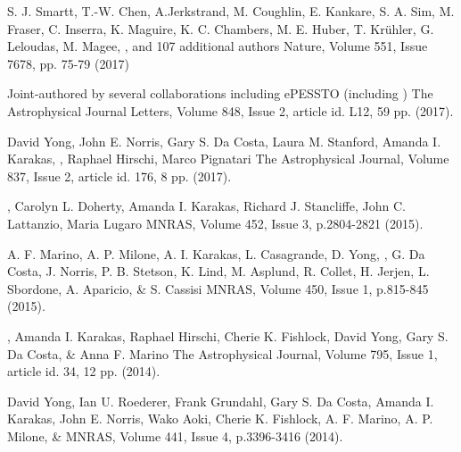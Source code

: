 {S. J. Smartt, T.-W. Chen, A.Jerkstrand, M. Coughlin, E. Kankare, S. A. Sim, M. Fraser, C. Inserra, K. Maguire, K. C. Chambers,
M. E. Huber, T. Kr\"uhler, G. Leloudas, M. Magee, , and 107 additional authors}
{Nature, Volume 551, Issue 7678, pp. 75-79 (2017)}

{Joint-authored by several collaborations including ePESSTO (including )}
{The Astrophysical Journal Letters, Volume 848, Issue 2, article id. L12, 59 pp. (2017).}

{David Yong, John E. Norris, Gary S. Da Costa, Laura M. Stanford, Amanda I. Karakas, , Raphael Hirschi, Marco Pignatari}
{The Astrophysical Journal, Volume 837, Issue 2, article id. 176, 8 pp. (2017).}

{, Carolyn L. Doherty, Amanda I. Karakas, Richard J. Stancliffe, John C. Lattanzio, Maria Lugaro}
{MNRAS, Volume 452, Issue 3, p.2804-2821 (2015).}

{A. F. Marino, A. P. Milone, A. I. Karakas, L. Casagrande, D. Yong, , G. Da Costa, J. Norris, P. B. Stetson,  K. Lind, M. Asplund, R. Collet, H. Jerjen, L. Sbordone, A. Aparicio, \& S. Cassisi}
{MNRAS, Volume 450, Issue 1, p.815-845 (2015).}

{, Amanda I. Karakas, Raphael Hirschi, Cherie K. Fishlock, David Yong, Gary S. Da Costa, \& Anna F. Marino}
{The Astrophysical Journal, Volume 795, Issue 1, article id. 34, 12 pp. (2014).}

{David Yong, Ian U. Roederer, Frank Grundahl, Gary S. Da Costa, Amanda I. Karakas, John E. Norris, Wako Aoki, Cherie K. Fishlock, A. F. Marino, A. P. Milone, \& }
{MNRAS, Volume 441, Issue 4, p.3396-3416 (2014).}

